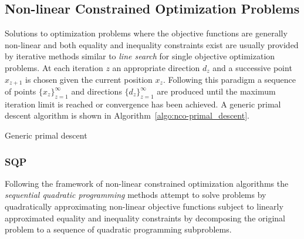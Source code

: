 \subsection{Non-linear Constrained Optimization Problems} \label{subsec:theorBack-NCOP}

Solutions to optimization problems where the objective functions are generally non-linear and both equality and inequality constraints exist are usually provided by iterative methods similar to \emph{line search} for single objective optimization problems. At each iteration $z$ an appropriate direction $d_z$ and a successive point $x_{z+1}$ is chosen given the current position $x_z$. Following this paradigm a sequence of points $\{x_z\}_{z=1}^\infty$ and directions $\{d_z\}_{z=1}^\infty$ are produced until the maximum iteration limit is reached or convergence has been achieved. A generic primal descent algorithm is shown in Algorithm~\ref{algo:nco-primal_descent}.

\begin{algorithm}[H]
\caption{Generic primal descent \label{algo:nco-primal_descent}} 
\end{algorithm}
\subsubsection{SQP} \label{subsubsec:theorBack-SQP}

Following the framework of non-linear constrained optimization algorithms the \emph{sequential quadratic programming} methods attempt to solve problems by quadratically approximating non-linear objective functions subject to linearly approximated equality and inequality constraints by decomposing the original problem to a sequence of quadratic programming subproblems.

